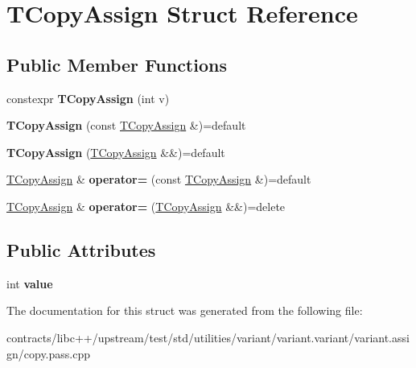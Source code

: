 \hypertarget{struct_t_copy_assign}{}\section{T\+Copy\+Assign Struct Reference}
\label{struct_t_copy_assign}
\subsection*{Public Member Functions}
\begin{DoxyCompactItemize}
\item 
\mbox{\label{struct_t_copy_assign_a8b0407675331019eb820440bd828491f}} 
constexpr {\bfseries T\+Copy\+Assign} (int v)
\item 
\mbox{\label{struct_t_copy_assign_a48c9394aaf8a3796375ae89c5a2c4e69}} 
{\bfseries T\+Copy\+Assign} (const \mbox{\hyperlink{struct_t_copy_assign}{T\+Copy\+Assign}} \&)=default
\item 
\mbox{\label{struct_t_copy_assign_a5f31262eeb1ee433f0dca58259facfe0}} 
{\bfseries T\+Copy\+Assign} (\mbox{\hyperlink{struct_t_copy_assign}{T\+Copy\+Assign}} \&\&)=default
\item 
\mbox{\label{struct_t_copy_assign_a443eee3da15b90f1f7994724a222663a}} 
\mbox{\hyperlink{struct_t_copy_assign}{T\+Copy\+Assign}} \& {\bfseries operator=} (const \mbox{\hyperlink{struct_t_copy_assign}{T\+Copy\+Assign}} \&)=default
\item 
\mbox{\label{struct_t_copy_assign_a5d77a59c50668cca7314c84a1b4d5161}} 
\mbox{\hyperlink{struct_t_copy_assign}{T\+Copy\+Assign}} \& {\bfseries operator=} (\mbox{\hyperlink{struct_t_copy_assign}{T\+Copy\+Assign}} \&\&)=delete
\end{DoxyCompactItemize}
\subsection*{Public Attributes}
\begin{DoxyCompactItemize}
\item 
\mbox{\label{struct_t_copy_assign_a26b1bb4769faa891593d8ae511e27ed7}} 
int {\bfseries value}
\end{DoxyCompactItemize}


The documentation for this struct was generated from the following file\+:\begin{DoxyCompactItemize}
\item 
contracts/libc++/upstream/test/std/utilities/variant/variant.\+variant/variant.\+assign/copy.\+pass.\+cpp\end{DoxyCompactItemize}
